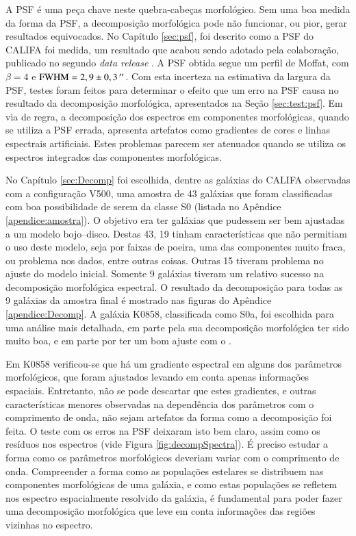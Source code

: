 A PSF é uma peça chave neste quebra-cabeças morfológico. Sem uma boa medida da
forma da PSF, a decomposição morfológica pode não funcionar, ou pior, gerar
resultados equivocados. No Capítulo \ref{sec:psf}, foi descrito como  a PSF do
CALIFA foi medida, um resultado que acabou sendo adotado pela colaboração,
publicado no segundo {\em data release} \citep{GarciaBenito2015}. A PSF obtida
segue um perfil de Moffat, com $\beta = 4$ e $\mathrm{FWHM}=2,9 \pm 0,3\,^{\prime\prime}$.
Com esta incerteza na estimativa da largura da PSF, testes foram feitos para
determinar o efeito que um erro na PSF causa no resultado da decomposição
morfológica, apresentados na Seção \ref{sec:test:psf}. Em via de regra, a
decomposição dos espectros em componentes morfológicas, quando se utiliza a PSF
errada, apresenta artefatos como gradientes de cores e linhas espectrais
artificiais. Estes problemas parecem ser atenuados quando se utiliza os
espectros integrados das componentes morfológicas.

No Capítulo \ref{sec:Decomp} foi escolhida, dentre as galáxias do CALIFA
observadas com a configuração V500, uma amostra de 43 galáxias que foram
classificadas com boa possibilidade de serem da classe S0 (listada no Apêndice
\ref{apendice:amostra}). O objetivo era ter galáxias que pudessem ser bem
ajustadas a um modelo bojo--disco. Destas 43, 19 tinham características que não
permitiam o uso deste modelo, seja por faixas de poeira, uma das componentes
muito fraca, ou problema nos dados, entre outras coisas. Outras 15 tiveram
problema no ajuste do modelo inicial. Somente 9 galáxias tiveram um relativo
sucesso na decomposição morfológica espectral. O resultado da decomposição para
todas as 9 galáxias da amostra final é mostrado nas figuras do Apêndice
\ref{apendice:Decomp}. A galáxia K0858, classificada como S0a, foi escolhida
para uma análise mais detalhada, em parte pela sua decomposição morfológica ter
sido muito boa, e em parte por ter um bom ajuste com o \starlight.

Em K0858 verificou-se que há um gradiente espectral em alguns dos parâmetros
morfológicos, que foram ajustados levando em conta apenas informações espaciais.
Entretanto, não se pode descartar que estes gradientes, e outras características
menores observadas na dependência dos parâmetros com o comprimento de onda, não
sejam artefatos da forma como a decomposição foi feita. O teste com os erros na
PSF deixaram isto bem claro, assim como os resíduos nos espectros (vide Figura
\ref{fig:decompSpectra}). É preciso estudar a forma como os parâmetros
morfológicos deveriam variar com o comprimento de onda. Compreender a forma como
as populações estelares se distribuem nas componentes morfológicas de uma
galáxia, e como estas populações se refletem nos espectro espacialmente
resolvido da galáxia, é fundamental para poder fazer uma decomposição
morfológica que leve em conta informações das regiões vizinhas no espectro.

